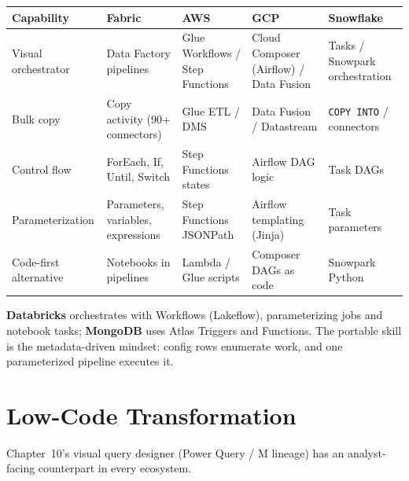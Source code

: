 \begin{center}
\footnotesize
\begin{tabular}{@{}p{2.8cm}p{3.2cm}p{3.2cm}p{3.2cm}p{3.2cm}@{}}
\toprule
\textbf{Capability} & \textbf{Fabric} & \textbf{AWS} & \textbf{GCP} & \textbf{Snowflake} \\
\midrule
Visual orchestrator & Data Factory pipelines & Glue Workflows / Step Functions & Cloud Composer (Airflow) / Data Fusion & Tasks / Snowpark orchestration \\
Bulk copy & Copy activity (90+ connectors) & Glue ETL / DMS & Data Fusion / Datastream & \texttt{COPY INTO} / connectors \\
Control flow & ForEach, If, Until, Switch & Step Functions states & Airflow DAG logic & Task DAGs \\
Parameterization & Parameters, variables, expressions & Step Functions JSONPath & Airflow templating (Jinja) & Task parameters \\
Code-first alternative & Notebooks in pipelines & Lambda / Glue scripts & Composer DAGs as code & Snowpark Python \\
\bottomrule
\end{tabular}
\end{center}

\noindent \textbf{Databricks} orchestrates with Workflows (Lakeflow), parameterizing jobs and
notebook tasks; \textbf{MongoDB} uses Atlas Triggers and Functions. The portable skill is the
metadata-driven mindset: config rows enumerate work, and one parameterized pipeline executes it.

\section{Low-Code Transformation}
%
Chapter~10's visual query designer (Power Query / M lineage) has an analyst-facing counterpart
in every ecosystem.

